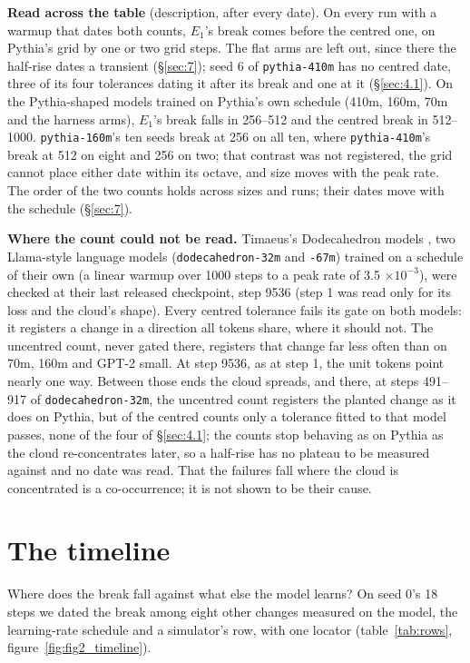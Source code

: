 \documentclass[11pt]{article}
\begin{document}
\textbf{Read across the table} (description, after every date). On every run with a warmup that dates both counts, $E_{1}$'s break comes before the centred one, on Pythia's grid by one or two grid steps. The flat arms are left out, since there the half-rise dates a transient (\S\ref{sec:7}); seed 6 of \texttt{pythia-410m} has no centred date, three of its four tolerances dating it after its break and one at it (\S\ref{sec:4.1}). On the Pythia-shaped models trained on Pythia's own schedule (410m, 160m, 70m and the harness arms), $E_{1}$'s break falls in 256--512 and the centred break in 512--1000. \texttt{pythia-160m}'s ten seeds break at 256 on all ten, where \texttt{pythia-410m}'s break at 512 on eight and 256 on two; that contrast was not registered, the grid cannot place either date within its octave, and size moves with the peak rate. The order of the two counts holds across sizes and runs; their dates move with the schedule (\S\ref{sec:7}).

\textbf{Where the count could not be read.} Timaeus's Dodecahedron models \citep{timaeus}, two Llama-style language models (\texttt{dodecahedron-32m} and \texttt{-67m}) trained on a schedule of their own (a linear warmup over 1000 steps to a peak rate of 3.5 $\times 10^{-3}$), were checked at their last released checkpoint, step 9536 (step 1 was read only for its loss and the cloud's shape). Every centred tolerance fails its gate on both models: it registers a change in a direction all tokens share, where it should not. The uncentred count, never gated there, registers that change far less often than on 70m, 160m and GPT-2 small. At step 9536, as at step 1, the unit tokens point nearly one way. Between those ends the cloud spreads, and there, at steps 491--917 of \texttt{dodecahedron-32m}, the uncentred count registers the planted change as it does on Pythia, but of the centred counts only a tolerance fitted to that model passes, none of the four of \S\ref{sec:4.1}; the counts stop behaving as on Pythia as the cloud re-concentrates later, so a half-rise has no plateau to be measured against and no date was read. That the failures fall where the cloud is concentrated is a co-occurrence; it is not shown to be their cause.

\section{The timeline}\label{sec:5}

Where does the break fall against what else the model learns? On seed 0's 18 steps we dated the break among eight other changes measured on the model, the learning-rate schedule and a simulator's row, with one locator (table~\ref{tab:rows}, figure~\ref{fig:fig2_timeline}).
\end{document}
